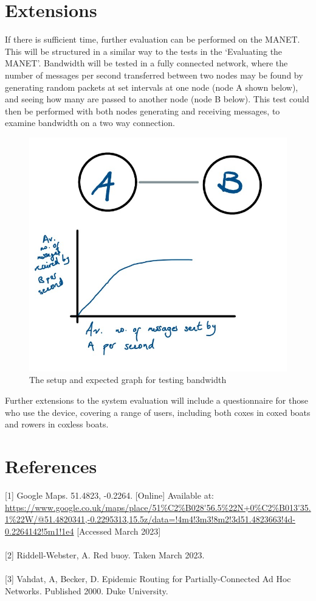 \documentclass[10pt, a4paper]{article}
\begin{document}
\section*{Extensions}
If there is sufficient time, further evaluation can be performed on the MANET. This will be structured in a similar way to the tests in the `Evaluating the MANET'. Bandwidth will be tested in a fully connected network, where the number of messages per second transferred between two nodes may be found by generating random packets at set intervals at one node (node A shown below), and seeing how many are passed to another node (node B below). 
This test could then be performed with both nodes generating and receiving messages, to examine bandwidth on a two way connection.\\
\begin{figure}[h]
\caption{The setup and expected graph for testing bandwidth}
\begin{center}
\includegraphics[scale=0.3]{bandwidth.jpg}
\end{center}
\end{figure}
Further extensions to the system evaluation will include a questionnaire for those who use the device, covering a range of users, including both coxes in coxed boats and rowers in coxless boats. \\ 

\FloatBarrier
\vspace{10px}
\section*{References}
\label{maps}[1] Google Maps. 51.4823, -0.2264. [Online] Available at: \url{https://www.google.co.uk/maps/place/51%C2%B028'56.5%22N+0%C2%B013'35.1%22W/@51.4820341,-0.2295313,15.5z/data=!4m4!3m3!8m2!3d51.4823663!4d-0.2264142!5m1!1e4} [Accessed March 2023] \\ \\
\label{myphoto}[2] Riddell-Webster, A. Red buoy. Taken March 2023. \\ \\
\label{epidemic}[3] Vahdat, A, Becker, D. Epidemic Routing for Partially-Connected Ad Hoc Networks. Published 2000. Duke University.
\end{document}
